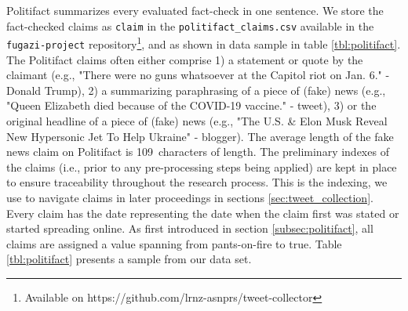 \documentclass[
10pt, %
a4paper, %
oneside, %
headinclude,footinclude, %
] {book}%
\newcommand{\pltfctTOTAL}{20174}
\newcommand{\pltfctMEANCLAIMLENCHARACTERS}{109}
\begin{document}
\label{app_linear_data_upsample}
\begin{table}[H]
  \tiny %
  \begin{center}
  
  \caption{Sample from our complete Politifact fact-checked news data set consisting of \pltfctTOTAL\ claims. The index contains the original index prior to any pre-processing steps. "claim" contains the actual news claim. "origin" is representing the origin of the claim (e.g., the claimant). "url" contains the Politifact subpage describing the claim and assessment of it. "truth\_value" is the Politifact truth evaluation of the claim. "stated\_on" shows the date of the claim. "party" shows the political affiliation of the claimant if any.}
  \label{tbl:politifact}
  \end{center}
\end{table}

Politifact summarizes every evaluated fact-check in one sentence. We store the fact-checked claims as \texttt{claim} in the \texttt{politifact\_claims.csv} available in the \texttt{fugazi-project} repository\footnote{Available on https://github.com/lrnz-asnprs/tweet-collector}, and as shown in data sample in table \ref{tbl:politifact}. The Politifact claims often either comprise 1) a statement or quote by the claimant (e.g., "There were no guns whatsoever at the Capitol riot on Jan. 6." - Donald Trump), 2) a summarizing paraphrasing of a piece of (fake) news (e.g., "Queen Elizabeth died because of the COVID-19 vaccine." - tweet), 3) or the original headline of a piece of (fake) news (e.g., "The U.S. & Elon Musk Reveal New Hypersonic Jet To Help Ukraine" - blogger). The average length of the fake news claim on Politifact is \pltfctMEANCLAIMLENCHARACTERS\ characters of length. The preliminary indexes of the claims (i.e., prior to any pre-processing steps being applied) are kept in place to ensure traceability throughout the research process. This is the indexing, we use to navigate claims in later proceedings in sections \ref{sec:tweet_collection}. Every claim has the date representing the date when the claim first was stated or started spreading online. As first introduced in section \ref{subsec:politifact}, all claims are assigned a value spanning from pants-on-fire to true. Table \ref{tbl:politifact} presents a sample from our data set.


% 
\end{document}
